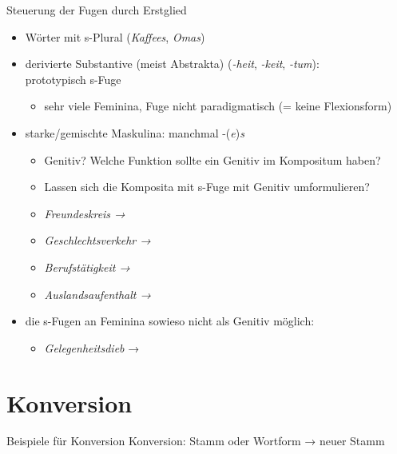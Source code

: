 \begin{frame}
  {Steuerung der Fugen durch Erstglied}
  \pause
  \begin{itemize}[<+->]
    \item Wörter mit s-Plural (\textit{Kaffees}, \textit{Omas}) 
      \Halbzeile
    \item \alert{derivierte} Substantive (meist Abstrakta) (\textit{-heit}, \textit{-keit}, \textit{-tum}):\\
      \alert{prototypisch s-Fuge}
      \begin{itemize}[<+->]
        \item sehr viele Feminina, Fuge nicht paradigmatisch (= keine Flexionsform)
      \end{itemize}
      \Halbzeile
    \item starke\slash gemischte Maskulina: manchmal -(\textit{e})\textit{s}
      \begin{itemize}[<+->]
        \item Genitiv? Welche Funktion sollte ein Genitiv im Kompositum haben?
        \item Lassen sich die Komposita mit s-Fuge mit Genitiv umformulieren?
        \item \textit{Freundeskreis → }
        \item \textit{Geschlechtsverkehr → }
        \item \textit{Berufstätigkeit → }
        \item \textit{Auslandsaufenthalt → }
      \end{itemize}
    \Halbzeile
  \item die s-Fugen an \alert{Feminina} sowieso nicht als Genitiv möglich:
      \begin{itemize}
        \item \textit{Gelegenheitsdieb} → 
      \end{itemize}
  \end{itemize}
\end{frame}

\section{Konversion}

\begin{frame}
  {Beispiele für Konversion}
  \pause
  Konversion: \alert{Stamm oder Wortform → neuer Stamm}
  \Halbzeile
  \pause
  \begin{exe}
    \pause
    \pause
    \pause
    \pause
    \pause
    \pause
    \pause
  \end{exe}
\end{frame}

